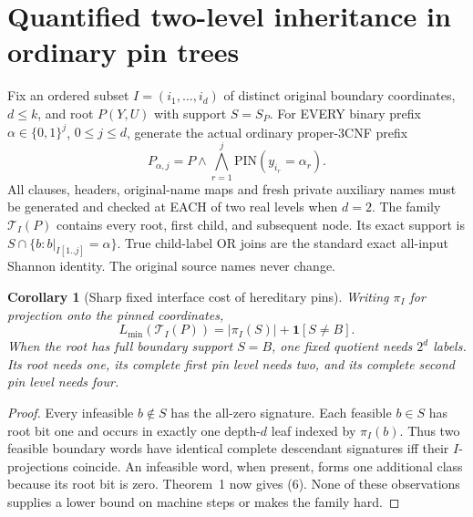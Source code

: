 \documentclass[11pt]{article}
\newtheorem{corollary}[theorem]{Corollary}
\begin{document}
\section{Quantified two-level inheritance in ordinary pin trees}
Fix an ordered subset $I=(i_1,\ldots,i_d)$ of distinct original
boundary coordinates, $d\le k$, and root $P(Y,U)$
with support $S=S_P$. For EVERY binary prefix
$\alpha\in\{0,1\}^j$, $0\le j\le d$, generate the
actual ordinary proper-3CNF prefix
\[
 P_{\alpha,j}=
  P\wedge\bigwedge_{r=1}^j
   \mathrm{PIN}(y_{i_r}=\alpha_r).                      \tag{5}
\]
All clauses, headers, original-name maps and fresh private
auxiliary names must be generated and checked at EACH of
two real levels when $d=2$. The family $\mathcal T_I(P)$
contains every root, first child, and subsequent node.
Its exact support is $S\cap
\{b:b|_{I[1..j]}=\alpha\}$. True child-label OR
joins are the standard exact all-input Shannon identity.
The original source names never change.

\begin{corollary}[Sharp fixed interface cost of hereditary pins]
Writing $\pi_I$ for projection onto the pinned coordinates,
\[
 \boxed{L_{\min}(\mathcal T_I(P))=
          |\pi_I(S)|+\mathbf1[S\ne B].}                 \tag{6}
\]
When the root has full boundary support $S=B$, one fixed
quotient needs $2^d$ labels. Its root needs one, its
complete first pin level needs two, and its complete
second pin level needs four.
\end{corollary}
\begin{proof}
Every infeasible $b\notin S$ has the all-zero signature.
Each feasible $b\in S$ has root bit one and occurs in
exactly one depth-$d$ leaf indexed by $\pi_I(b)$.
Thus two feasible boundary words have identical complete
descendant signatures iff their $I$-projections coincide.
An infeasible word, when present, forms one additional
class because its root bit is zero. Theorem~1 now
gives (6). None of these observations supplies a
lower bound on machine steps or makes the family hard.
\end{proof}
\end{document}

